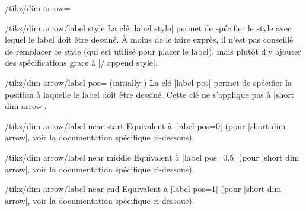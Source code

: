 \documentclass[a4paper]{ltxdoc}
\begin{document}
\begin{stylekey}{/tikz/dim arrow=}
  \begin{stylekey}{/tikz/dim arrow/label style}
  La clé |label style| permet de spécifier le style avec lequel le label doit être dessiné.
  À moins de le faire exprès, il n'est pas conseillé de remplacer ce style (qui est utilisé pour placer le label), mais plutôt d'y ajouter des spécifications grace à |/.append style|.

\begin{codeexample}[]
\end{codeexample}
  \end{stylekey}

  \begin{key}{/tikz/dim arrow/label pos= (initially )}
  La clé |label pos| permet de spécifier la position  à laquelle le label doit être dessiné.
  Cette clé ne s'applique pas à |short dim arrow|.

\begin{codeexample}[]
\end{codeexample}
  \end{key}

  \begin{key}{/tikz/dim arrow/label near start}
  Equivalent à |label pos=0| (pour |short dim arrow|, voir la documentation spécifique ci-dessous).
  \end{key}

  \begin{key}{/tikz/dim arrow/label near middle}
  Equivalent à |label pos=0.5| (pour |short dim arrow|, voir la documentation spécifique ci-dessous).
  \end{key}

  \begin{key}{/tikz/dim arrow/label near end}
  Equivalent à |label pos=1| (pour |short dim arrow|, voir la documentation spécifique ci-dessous).
  \end{key}


\end{stylekey}
\end{document}
